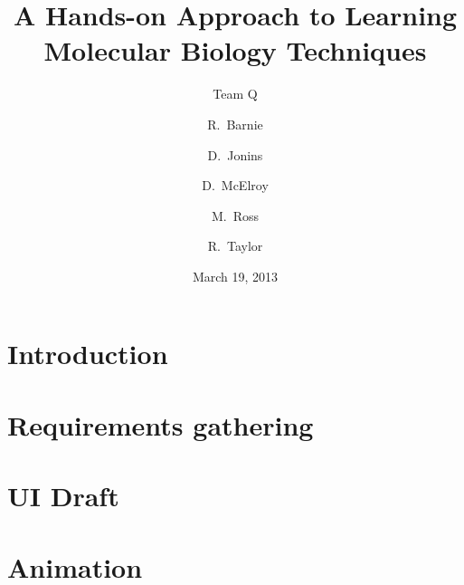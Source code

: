 \documentclass{beamer}
\title[PCR]{A Hands-on Approach to Learning Molecular Biology Techniques}
\subtitle{Team Q}
\author{R.~Barnie \and D.~Jonins \and D.~McElroy \and M.~Ross \and R.~Taylor}
\date{March 19, 2013}
\begin{document}
\section{Introduction}





\section{Requirements gathering}


\section{UI Draft}


\section{Animation}

\end{document}
